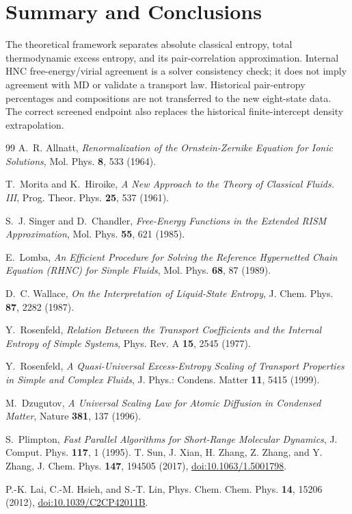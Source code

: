 \documentclass[11pt,a4paper]{article}
\begin{document}



\section{Summary and Conclusions}

The theoretical framework separates absolute classical entropy, total thermodynamic excess entropy, and its pair-correlation approximation. Internal HNC free-energy/virial agreement is a solver consistency check; it does not imply agreement with MD or validate a transport law. Historical pair-entropy percentages and compositions are not transferred to the new eight-state data. The correct screened endpoint also replaces the historical finite-intercept density extrapolation.



\begin{thebibliography}{99}
A.~R. Allnatt, \textit{Renormalization of the Ornstein-Zernike Equation for Ionic Solutions}, Mol. Phys. \textbf{8}, 533 (1964).

T.~Morita and K.~Hiroike, \textit{A New Approach to the Theory of Classical Fluids. III}, Prog. Theor. Phys. \textbf{25}, 537 (1961).

S.~J. Singer and D.~Chandler, \textit{Free-Energy Functions in the Extended RISM Approximation}, Mol. Phys. \textbf{55}, 621 (1985).

E.~Lomba, \textit{An Efficient Procedure for Solving the Reference Hypernetted Chain Equation (RHNC) for Simple Fluids}, Mol. Phys. \textbf{68}, 87 (1989).

D.~C. Wallace, \textit{On the Interpretation of Liquid-State Entropy}, J. Chem. Phys. \textbf{87}, 2282 (1987).

Y.~Rosenfeld, \textit{Relation Between the Transport Coefficients and the Internal Entropy of Simple Systems}, Phys. Rev. A \textbf{15}, 2545 (1977).

Y.~Rosenfeld, \textit{A Quasi-Universal Excess-Entropy Scaling of Transport Properties in Simple and Complex Fluids}, J. Phys.: Condens. Matter \textbf{11}, 5415 (1999).

M.~Dzugutov, \textit{A Universal Scaling Law for Atomic Diffusion in Condensed Matter}, Nature \textbf{381}, 137 (1996).

S.~Plimpton, \textit{Fast Parallel Algorithms for Short-Range Molecular Dynamics}, J. Comput. Phys. \textbf{117}, 1 (1995).
T. Sun, J. Xian, H. Zhang, Z. Zhang, and Y. Zhang,
J. Chem. Phys. \textbf{147}, 194505 (2017),
\href{https://doi.org/10.1063/1.5001798}{doi:10.1063/1.5001798}.

P.-K. Lai, C.-M. Hsieh, and S.-T. Lin,
Phys. Chem. Chem. Phys. \textbf{14}, 15206 (2012),
\href{https://doi.org/10.1039/C2CP42011B}{doi:10.1039/C2CP42011B}.

\end{thebibliography}
\end{document}
